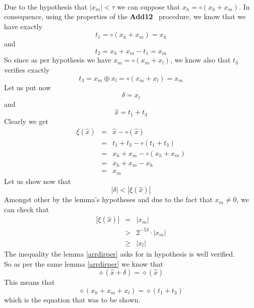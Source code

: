 \documentclass[a4paper,10pt,twoside]{article}
\newenvironment{proof}[1][Proof]{\begin{trivlist}
\item[\hskip \labelsep {\bfseries #1}]}{\end{trivlist}}
\newcommand{\qed}{\nobreak \ifvmode \relax \else \ifdim \lastskip<1.5em \hskip-\lastskip
\hskip1.5em plus0em minus0.5em \fi \nobreak \vrule height0.75em width0.5em depth0.25em\fi}
\newcommand{\hi}{\ensuremath{\mathit{h}}}
\newcommand{\mi}{\ensuremath{\mathit{m}}}
\newcommand{\lo}{\ensuremath{\mathit{l}}}
\newcommand{\Add}{{\bf Add12}}
\begin{document}
\begin{proof} ~ \\
Due to the hypothesis that $\left \vert x_\mi \right \vert < \tau$ we can suppose that $x_\hi = \circ \left( x_\hi + x_\mi \right)$.
In consequence, using the properties of the \Add~ procedure, we know that we have exactly
$$t_1 = \circ \left( x_\hi + x_\mi \right) = x_\hi$$
and
$$t_2 = x_\hi + x_\mi - t_1 = x_\mi$$
So since as per hypothesis we have $x_\mi = \circ \left( x_\mi + x_\lo \right)$, we know also that
$t_3$ verifies exactly
$$t_3 = x_\mi \oplus x_\lo = \circ\left( x_\mi + x_\lo \right) = x_\mi$$
Let us put now
$$\delta = x_\lo$$
and
$$\hat{x} = t_1 + t_3$$
Clearly we get
\begin{eqnarray*}
\xi\left( \hat{x} \right) & = & \hat{x} - \circ\left( \hat{x} \right) \\
& = & t_1 + t_3 - \circ\left( t_1 + t_3 \right) \\
& = & x_\hi + x_\mi - \circ\left( x_\hi + x_\mi \right) \\
& = & x_\hi + x_\mi - x_\hi \\
& = & x_\mi
\end{eqnarray*}
Let us show now that
$$\left \vert \delta \right \vert < \left \vert \xi\left( \hat{x} \right) \right \vert$$
Amongst other by the lemma's hypotheses and due to the fact that $x_\mi \not = 0$, we can check that
\begin{eqnarray*}
\left \vert \xi\left( \hat{x} \right) \right \vert
& = & \left \vert x_\mi \right \vert \\
& > & 2^{-53} \cdot \left \vert x_\mi \right \vert \\
& \geq & \left \vert x_\lo \right \vert
\end{eqnarray*}
The inequality the lemma \ref{arrdirper} asks for in hypothesis is well verified.\\
So as per the same lemma \ref{arrdirper} we know that
$$\diamond \left( \hat{x} + \delta \right) = \diamond\left( \hat{x} \right)$$
This means that
$$\diamond \left( x_\hi + x_\mi + x_\lo \right) = \diamond\left( t_1 + t_3 \right)$$
which is the equation that was to be shown.\qed
\end{proof}
\end{document}
